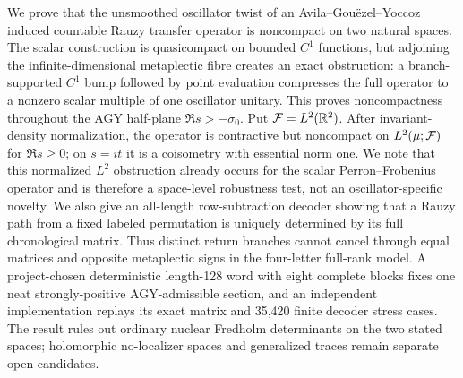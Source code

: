 We prove that the unsmoothed oscillator twist of an
Avila--Gou\"ezel--Yoccoz induced countable Rauzy transfer operator is noncompact on
two natural spaces.  The scalar construction is quasicompact on bounded
\(C^1\) functions, but adjoining the infinite-dimensional metaplectic fibre
creates an exact obstruction: a branch-supported \(C^1\) bump followed by
point evaluation compresses the full operator to a nonzero scalar multiple
of one oscillator unitary.  This proves noncompactness throughout the AGY
half-plane \(\Re s>-\sigma _0\).  Put \(\mathcal F=L^2(\mathbb R^2)\).  After
invariant-density normalization, the operator is contractive but noncompact
on \(L^2(\mu;\mathcal F)\) for \(\Re s\ge0\); on \(s=it\) it is a coisometry with
essential norm one.  We
note that this normalized \(L^2\) obstruction already occurs for the scalar
Perron--Frobenius operator and is therefore a space-level robustness test,
not an oscillator-specific novelty.  We
also give an all-length row-subtraction decoder showing that a Rauzy path
from a fixed labeled permutation is uniquely determined by its full
chronological matrix.  Thus distinct return branches cannot cancel through
equal matrices and opposite metaplectic signs in the four-letter full-rank
model.  A project-chosen deterministic length-128 word with eight complete
blocks fixes one neat strongly-positive AGY-admissible section, and an
independent implementation
replays its exact matrix and 35,420 finite decoder stress cases.  The result
rules out ordinary nuclear Fredholm determinants on the two stated spaces;
holomorphic no-localizer spaces and generalized traces remain separate open
candidates.
